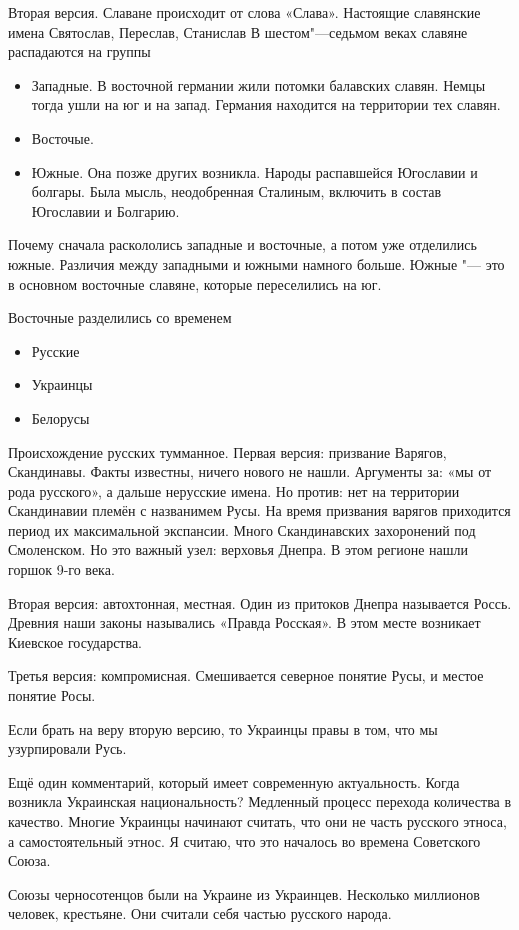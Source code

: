 \begin{azItems}
Вторая версия. Славане происходит от слова «Слава». Настоящие славянские имена Святослав, Переслав, Станислав\ldotst{} В шестом"---седьмом веках славяне распадаются на группы
\begin{itemize}
\item Западные. В восточной германии жили потомки балавских славян. Немцы тогда ушли на юг и на запад. Германия находится на территории тех славян. 
\item Восточые.
\item Южные. Она позже других возникла. Народы распавшейся Югославии и болгары. Была мысль, неодобренная Сталиным, включить в состав Югославии и Болгарию.
\end{itemize}
Почему сначала раскололись западные и восточные, а потом уже отделились южные. Различия между западными и южными намного больше. Южные "--- это в основном восточные славяне, которые переселились на юг. 

Восточные разделились со временем
\begin{itemize}
\item Русские
\item Украинцы
\item Белорусы
\end{itemize}
Происхождение русских тумманное. Первая версия: призвание Варягов, Скандинавы. Факты известны, ничего нового не нашли. Аргументы за: «мы от рода русского», а дальше нерусские имена. Но против: нет на территории Скандинавии племён с названимем Русы. На время призвания варягов приходится период их максимальной экспансии. Много Скандинавских захоронений под Смоленском. Но это важный узел: верховья Днепра. В этом регионе нашли горшок 9-го века.

Вторая версия: автохтонная, местная. Один из притоков Днепра называется Россь. Древния наши законы назывались «Правда Росская». В этом месте возникает Киевское государства.

Третья версия: компромисная. Смешивается северное понятие Русы, и местое понятие Росы.

Если брать на веру вторую версию, то Украинцы правы в том, что мы узурпировали Русь. 

Ещё один комментарий, который имеет современную актуальность. Когда возникла Украинская национальность? Медленный процесс перехода количества в качество. Многие Украинцы начинают считать, что они не часть русского этноса, а самостоятельный этнос. Я считаю, что это началось во времена Советского Союза.

Союзы черносотенцов были на Украине из Украинцев. Несколько миллионов человек, крестьяне. Они считали себя частью русского народа.


\end{azItems}
